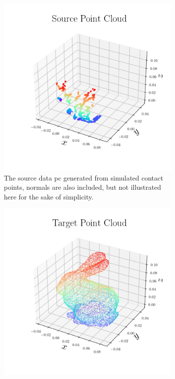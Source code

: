\begin{figure}[!h]
	\centering
	\begin{subfigure}[b]{0.48\textwidth}
		\centering
		\includegraphics[width=\textwidth]{chapters/1-tactile-perception/fig/matplotlib/pc_source.png}
		\caption{The source data  \gls{pc} generated from simulated contact points, normals are also included, but not illustrated here for the sake of simplicity.}
		\label{fig:pe-pc-source}
	\end{subfigure}
	\hfill
	\begin{subfigure}[b]{0.48\textwidth}
		\centering
		\includegraphics[width=\textwidth]{chapters/1-tactile-perception/fig/matplotlib/pc_target.png}

\end{subfigure}
\end{figure}
